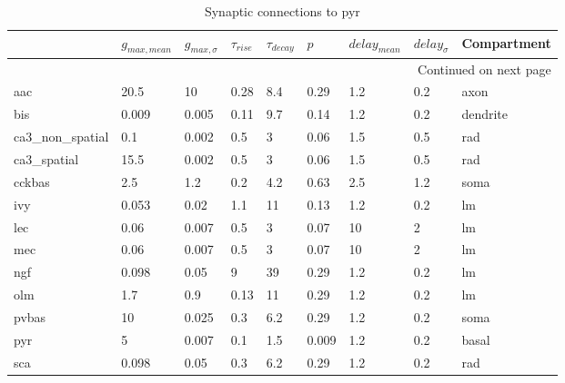 \begin{longtable}{lllllllll}
\caption{Synaptic connections to pyr}\label{pyr_synapses}\\
\toprule
{} &   $g_{max, mean}$ & $g_{max, \sigma}$ & $\tau_{rise}$ & $\tau_{decay}$ &   $p$ & $delay_{mean}$ & $delay_{\sigma}$ & Compartment \\
\midrule
\endhead
\midrule
\multicolumn{9}{r}{{Continued on next page}} \\
\midrule
\endfoot

\bottomrule
\endlastfoot
aac             &   20.5 &       10 &     0.28 &       8.4 &   0.29 &   1.2 &       0.2 &          axon\ \\
bis             &  0.009 &    0.005 &     0.11 &       9.7 &   0.14 &   1.2 &       0.2 &      dendrite\ \\
ca3\_non\_spatial &    0.1 &    0.002 &      0.5 &         3 &   0.06 &   1.5 &       0.5 &           rad\ \\
ca3\_spatial     &   15.5 &    0.002 &      0.5 &         3 &   0.06 &   1.5 &       0.5 &           rad\ \\
cckbas          &    2.5 &      1.2 &      0.2 &       4.2 &   0.63 &   2.5 &       1.2 &          soma\ \\
ivy             &  0.053 &     0.02 &      1.1 &        11 &   0.13 &   1.2 &       0.2 &            lm\ \\
lec             &   0.06 &    0.007 &      0.5 &         3 &   0.07 &    10 &         2 &            lm\ \\
mec             &   0.06 &    0.007 &      0.5 &         3 &   0.07 &    10 &         2 &            lm\ \\
ngf             &  0.098 &     0.05 &        9 &        39 &   0.29 &   1.2 &       0.2 &            lm\ \\
olm             &    1.7 &      0.9 &     0.13 &        11 &   0.29 &   1.2 &       0.2 &            lm\ \\
pvbas           &     10 &    0.025 &      0.3 &       6.2 &   0.29 &   1.2 &       0.2 &          soma\ \\
pyr             &      5 &    0.007 &      0.1 &       1.5 &  0.009 &   1.2 &       0.2 &         basal\ \\
sca             &  0.098 &     0.05 &      0.3 &       6.2 &   0.29 &   1.2 &       0.2 &           rad\ \\
\end{longtable}
